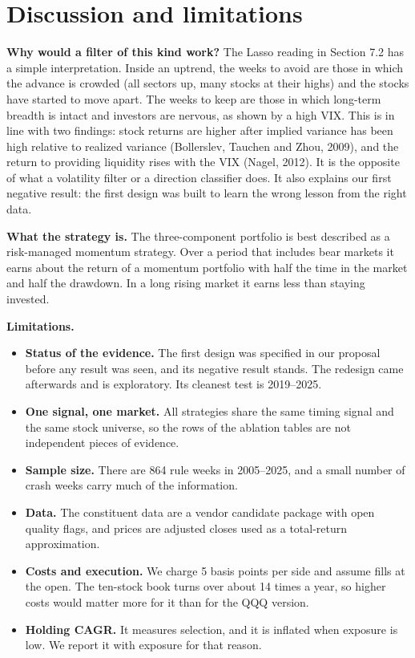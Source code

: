 \documentclass[11pt]{article}
\providecommand{\tightlist}{\setlength{\itemsep}{2pt}\setlength{\parskip}{0pt}}
\begin{document}
\section{Discussion and limitations}

\textbf{Why would a filter of this kind work?} The Lasso reading in Section 7.2 has a simple interpretation. Inside an uptrend, the weeks to avoid are those in which the advance is crowded (all sectors up, many stocks at their highs) and the stocks have started to move apart. The weeks to keep are those in which long-term breadth is intact and investors are nervous, as shown by a high VIX. This is in line with two findings: stock returns are higher after implied variance has been high relative to realized variance (Bollerslev, Tauchen and Zhou, 2009), and the return to providing liquidity rises with the VIX (Nagel, 2012). It is the opposite of what a volatility filter or a direction classifier does. It also explains our first negative result: the first design was built to learn the wrong lesson from the right data.

\textbf{What the strategy is.} The three-component portfolio is best described as a risk-managed momentum strategy. Over a period that includes bear markets it earns about the return of a momentum portfolio with half the time in the market and half the drawdown. In a long rising market it earns less than staying invested.

\textbf{Limitations.}

\begin{itemize}
\tightlist
\item
  \textbf{Status of the evidence.} The first design was specified in our proposal before any result was seen, and its negative result stands. The redesign came afterwards and is exploratory. Its cleanest test is 2019--2025.
\item
  \textbf{One signal, one market.} All strategies share the same timing signal and the same stock universe, so the rows of the ablation tables are not independent pieces of evidence.
\item
  \textbf{Sample size.} There are 864 rule weeks in 2005--2025, and a small number of crash weeks carry much of the information.
\item
  \textbf{Data.} The constituent data are a vendor candidate package with open quality flags, and prices are adjusted closes used as a total-return approximation.
\item
  \textbf{Costs and execution.} We charge 5 basis points per side and assume fills at the open. The ten-stock book turns over about 14 times a year, so higher costs would matter more for it than for the QQQ version.
\item
  \textbf{Holding CAGR.} It measures selection, and it is inflated when exposure is low. We report it with exposure for that reason.
\end{itemize}
\end{document}

